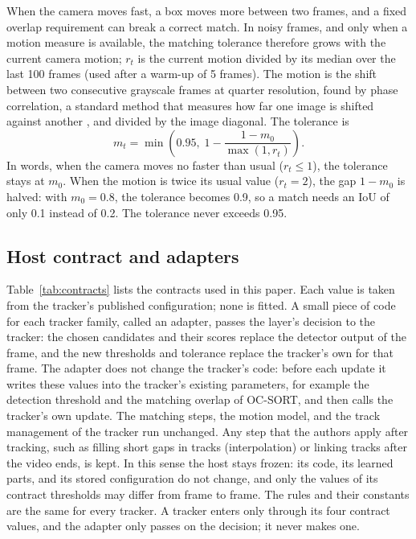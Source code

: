 \documentclass[pdflatex,sn-mathphys-num,iicol]{sn-jnl}
\begin{document}
When the camera moves fast, a box moves more between two frames, and a fixed
overlap requirement can break a correct match. In noisy frames, and only when
a motion measure is available, the matching tolerance therefore grows with
the current camera motion; $r_t$ is the current motion divided by its median
over the last 100 frames (used after a warm-up of 5 frames). The motion is the shift between two consecutive grayscale
frames at quarter resolution, found by phase correlation, a standard method
that measures how far one image is shifted against another
\cite{reddy1996phasecorr}, and divided by the image diagonal. The tolerance is
\begin{equation}
m_t=\min\!\left(0.95,\;1-\frac{1-m_0}{\max(1,r_t)}\right).
\label{eq:motion}
\end{equation}
In words, when the camera moves no faster than usual ($r_t\le1$), the
tolerance stays at $m_0$. When the motion is twice its usual value
($r_t=2$), the gap $1-m_0$ is halved: with $m_0=0.8$, the tolerance becomes
0.9, so a match needs an IoU of only 0.1 instead of 0.2. The tolerance never
exceeds 0.95.

\subsection{Host contract and adapters}\label{sec:contract}
Table~\ref{tab:contracts} lists the contracts used in this paper. Each value
is taken from the tracker's published configuration; none is fitted. A small
piece of code for each tracker family, called an adapter, passes the layer's
decision to the tracker:
the chosen candidates and their scores replace the detector output of the
frame, and the new thresholds and tolerance replace the tracker's own for
that frame. The adapter does not change the tracker's code: before each
update it writes these values into the tracker's existing parameters, for
example the detection threshold and the matching overlap of OC-SORT, and then
calls the tracker's own update. The matching steps, the motion model, and the
track management of the tracker run unchanged. Any step that the authors apply after tracking, such as
filling short gaps in tracks (interpolation) or linking tracks after the video
ends, is kept. In this sense the host stays frozen: its code, its learned
parts, and its stored configuration do not change, and only the values of its
contract thresholds may differ from frame to frame. The rules and their constants are
the same for every tracker. A tracker enters only through its four contract
values, and the adapter only passes on the decision; it never makes one.
\end{document}
